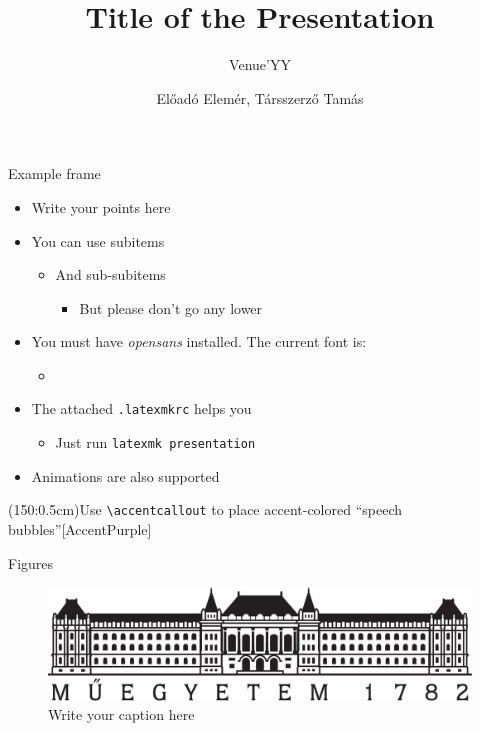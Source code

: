 \documentclass[t,aspectratio=169]{beamer}
\title{Title of the Presentation}
\subtitle{Venue'YY}
\author{Előadó Elemér, Társszerző Tamás}
\newcommand{\extractFontName}[1]{%
  \StrBetween{#1}{[}{]}
}
\begin{document}
	{
		\begin{frame}
			\titlepage
		\end{frame}
	}
	\addtocounter{framenumber}{-1}
  
\begin{frame}{Example frame}
  \begin{itemize}
  \item Write your points here
  \item You can use subitems
    \begin{itemize}
    \item And sub-subitems
      \begin{itemize}
      \item But please don't go any lower
      \end{itemize}
    \end{itemize}
  \item You must have \emph{opensans} installed. The current font is: 
  \begin{itemize}
      \item \extractFontName{\expandafter\meaning\the\font}
  \end{itemize}

  \item The attached \texttt{.latexmkrc} helps you
    \begin{itemize}
    \item Just run \texttt{latexmk presentation}
    \end{itemize}
  \item<2-> Animations are also supported
  \end{itemize}
    
  (150:0.5cm){Use \texttt{\textbackslash accentcallout} to place accent-colored ``speech bubbles''}[AccentPurple]
\end{frame}

\begin{frame}[c]{Figures}
  \begin{figure}
    \centering
    \includegraphics[width=\textwidth]{figures/BME.pdf}
    \caption{Write your caption here}
  \end{figure}
\end{frame}
\end{document}
